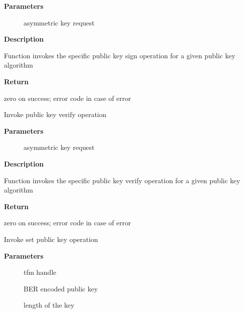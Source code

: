 \documentclass[a4paper,8pt,english]{sphinxmanual}
\begin{document}
\textbf{Parameters}
\begin{description}
\item[{}] \leavevmode
asymmetric key request

\end{description}

\textbf{Description}

Function invokes the specific public key sign operation for a given
public key algorithm

\textbf{Return}

zero on success; error code in case of error

\begin{fulllineitems}
\label{crypto/api-akcipher:c.crypto_akcipher_verify}
Invoke public key verify operation

\end{fulllineitems}


\textbf{Parameters}
\begin{description}
\item[{}] \leavevmode
asymmetric key request

\end{description}

\textbf{Description}

Function invokes the specific public key verify operation for a given
public key algorithm

\textbf{Return}

zero on success; error code in case of error

\begin{fulllineitems}
\label{crypto/api-akcipher:c.crypto_akcipher_set_pub_key}
Invoke set public key operation

\end{fulllineitems}


\textbf{Parameters}
\begin{description}
\item[{}] \leavevmode
tfm handle

\item[{}] \leavevmode
BER encoded public key

\item[{}] \leavevmode
length of the key

\end{description}
\end{document}
